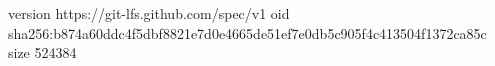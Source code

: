 version https://git-lfs.github.com/spec/v1
oid sha256:b874a60ddc4f5dbf8821e7d0e4665de51ef7e0db5c905f4c413504f1372ca85c
size 524384
